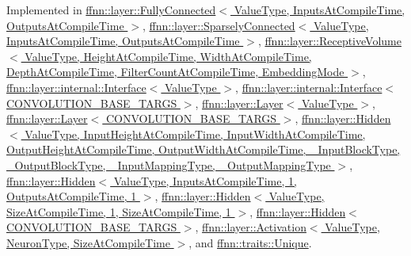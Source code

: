 Implemented in \hyperlink{classffnn_1_1layer_1_1_fully_connected_a4d449a95d01e3ad04a7813d70d296e0c}{ffnn\-::layer\-::\-Fully\-Connected$<$ Value\-Type, Inputs\-At\-Compile\-Time, Outputs\-At\-Compile\-Time $>$}, \hyperlink{classffnn_1_1layer_1_1_sparsely_connected_a0996cd78dc2f76cab36fac2ec5c8f323}{ffnn\-::layer\-::\-Sparsely\-Connected$<$ Value\-Type, Inputs\-At\-Compile\-Time, Outputs\-At\-Compile\-Time $>$}, \hyperlink{classffnn_1_1layer_1_1_receptive_volume_aebfd8f149057b061d6880669376175e3}{ffnn\-::layer\-::\-Receptive\-Volume$<$ Value\-Type, Height\-At\-Compile\-Time, Width\-At\-Compile\-Time, Depth\-At\-Compile\-Time, Filter\-Count\-At\-Compile\-Time, Embedding\-Mode $>$}, \hyperlink{classffnn_1_1layer_1_1internal_1_1_interface_a88b5bd86aafd361d3a84dc6cba211195}{ffnn\-::layer\-::internal\-::\-Interface$<$ Value\-Type $>$}, \hyperlink{classffnn_1_1layer_1_1internal_1_1_interface_a88b5bd86aafd361d3a84dc6cba211195}{ffnn\-::layer\-::internal\-::\-Interface$<$ C\-O\-N\-V\-O\-L\-U\-T\-I\-O\-N\-\_\-\-B\-A\-S\-E\-\_\-\-T\-A\-R\-G\-S $>$}, \hyperlink{classffnn_1_1layer_1_1_layer_a23f5f3c958d888632010327471c7b012}{ffnn\-::layer\-::\-Layer$<$ Value\-Type $>$}, \hyperlink{classffnn_1_1layer_1_1_layer_a23f5f3c958d888632010327471c7b012}{ffnn\-::layer\-::\-Layer$<$ C\-O\-N\-V\-O\-L\-U\-T\-I\-O\-N\-\_\-\-B\-A\-S\-E\-\_\-\-T\-A\-R\-G\-S $>$}, \hyperlink{classffnn_1_1layer_1_1_hidden_a696f61b2d9b661b7a8d6bdb3dc32b536}{ffnn\-::layer\-::\-Hidden$<$ Value\-Type, Input\-Height\-At\-Compile\-Time, Input\-Width\-At\-Compile\-Time, Output\-Height\-At\-Compile\-Time, Output\-Width\-At\-Compile\-Time, \-\_\-\-Input\-Block\-Type, \-\_\-\-Output\-Block\-Type, \-\_\-\-Input\-Mapping\-Type, \-\_\-\-Output\-Mapping\-Type $>$}, \hyperlink{classffnn_1_1layer_1_1_hidden_a696f61b2d9b661b7a8d6bdb3dc32b536}{ffnn\-::layer\-::\-Hidden$<$ Value\-Type, Inputs\-At\-Compile\-Time, 1, Outputs\-At\-Compile\-Time, 1 $>$}, \hyperlink{classffnn_1_1layer_1_1_hidden_a696f61b2d9b661b7a8d6bdb3dc32b536}{ffnn\-::layer\-::\-Hidden$<$ Value\-Type, Size\-At\-Compile\-Time, 1, Size\-At\-Compile\-Time, 1 $>$}, \hyperlink{classffnn_1_1layer_1_1_hidden_a696f61b2d9b661b7a8d6bdb3dc32b536}{ffnn\-::layer\-::\-Hidden$<$ C\-O\-N\-V\-O\-L\-U\-T\-I\-O\-N\-\_\-\-B\-A\-S\-E\-\_\-\-T\-A\-R\-G\-S $>$}, \hyperlink{classffnn_1_1layer_1_1_activation_a045ecc330b67cdc3a41d6d7fc3a8dbf2}{ffnn\-::layer\-::\-Activation$<$ Value\-Type, Neuron\-Type, Size\-At\-Compile\-Time $>$}, and \hyperlink{classffnn_1_1traits_1_1_unique_af1e937c2908ed2ff707d6a7d1b5b13d2}{ffnn\-::traits\-::\-Unique}.

